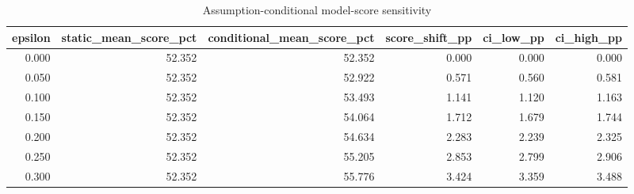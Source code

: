 \begin{table}
\caption{Assumption-conditional model-score sensitivity}
\begin{tabular}{rrrrrr}
\toprule
epsilon & static\_mean\_score\_pct & conditional\_mean\_score\_pct & score\_shift\_pp & ci\_low\_pp & ci\_high\_pp \\
\midrule
0.000 & 52.352 & 52.352 & 0.000 & 0.000 & 0.000 \\
0.050 & 52.352 & 52.922 & 0.571 & 0.560 & 0.581 \\
0.100 & 52.352 & 53.493 & 1.141 & 1.120 & 1.163 \\
0.150 & 52.352 & 54.064 & 1.712 & 1.679 & 1.744 \\
0.200 & 52.352 & 54.634 & 2.283 & 2.239 & 2.325 \\
0.250 & 52.352 & 55.205 & 2.853 & 2.799 & 2.906 \\
0.300 & 52.352 & 55.776 & 3.424 & 3.359 & 3.488 \\
\bottomrule
\end{tabular}
\end{table}
